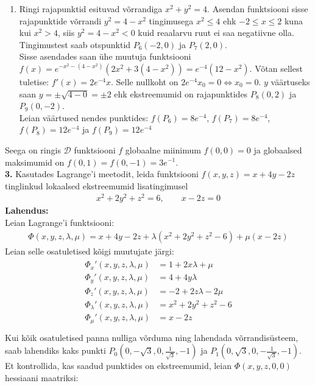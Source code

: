 \documentclass{article}
\begin{document}
\begin{enumerate}
\item Ringi rajapunktid esituvad võrrandiga $x^2+y^2=4$. Asendan funktsiooni sisse rajapunktide võrrandi $y^2=4-x^2$ tingimusega $x^2\leq4$ ehk $-2\leq x\leq2$ kuna kui $x^2>4$, siis $y^2=4-x^2<0$ kuid reaalarvu ruut ei saa negatiivne olla.\\
Tingimustest saab otspunktid $P_6(-2,0)$ ja $P_7(2,0)$.\\
Sisse asendades saan ühe muutuja funktsiooni $f(x)=e^{-x^2-(4-x^2)}(2x^2+3(4-x^2))=e^{-4}(12-x^2)$. Võtan sellest tuletise: $f'(x)=2e^{-4}x$. Selle nullkoht on $2e^{-4}x_0=0\Leftrightarrow x_0=0$. $y$ väärtuseks saan $y=\pm\sqrt{4-0}=\pm2$ ehk ekstreemumid on rajapunktides $P_8(0,2)$ ja $P_9(0,-2)$.\\
Leian väärtused nendes punktides: $f(P_6)=8e^{-4}$, $f(P_7)=8e^{-4}$, $f(P_8)=12e^{-4}$ ja $f(P_9)=12e^{-4}$
\end{enumerate}
Seega on ringis $\mathcal{D}$ funktsiooni $f$ globaalne miinimum $f(0,0)=0$ ja globaalsed maksimumid on $f(0,1)=f(0,-1)=3e^{-1}$.\pagebreak\\
\textbf{3.} Kasutades Lagrange'i meetodit, leida funktsiooni $f(x,y,z)=x+4y-2z$ tinglinkud lokaalsed ekstreemumid lisatingimusel
\begin{gather*}
x^2+2y^2+z^2=6,\quad\quad x-2z=0
\end{gather*}
\textbf{Lahendus:}\\
Leian Lagrange'i funktsiooni:
\begin{gather*}
\Phi(x,y,z,\lambda,\mu)=x+4y-2z+\lambda(x^2+2y^2+z^2-6)+\mu(x-2z)
\end{gather*}
Leian selle osatuletised kõigi muutujate järgi:
\begin{gather*}
\begin{aligned}
\Phi_x'(x,y,z,\lambda,\mu)&=1+2x\lambda+\mu\\
\Phi_y'(x,y,z,\lambda,\mu)&=4+4y\lambda\\
\Phi_z'(x,y,z,\lambda,\mu)&=-2+2z\lambda-2\mu\\
\Phi_\lambda'(x,y,z,\lambda,\mu)&=x^2+2y^2+z^2-6\\
\Phi_\mu'(x,y,z,\lambda,\mu)&=x-2z\\
\end{aligned}
\end{gather*}
Kui kõik osatuletised panna nulliga võrduma ning lahendada võrrandisüsteem, saab lahendiks kaks punkti $P_0(0,-\sqrt{3},0,\frac{1}{\sqrt{3}},-1)$ ja $P_1(0,\sqrt{3},0,-\frac{1}{\sqrt{3}},-1)$.\\
Et kontrollida, kas saadud punktides on ekstreemumid, leian $\Phi(x,y,z,0,0)$ hessiaani maatriksi:
\end{document}
